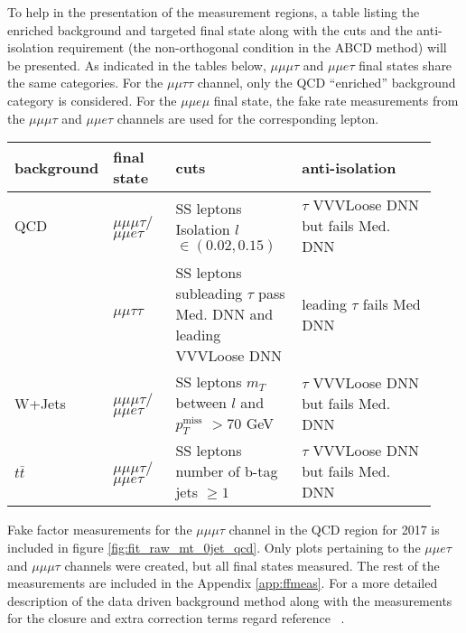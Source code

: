 To help in the presentation of the measurement regions, a table listing the enriched background and targeted final state along with the cuts and the anti-isolation requirement (the non-orthogonal condition in the ABCD method) will be presented. 
As indicated in the tables below, $\mu\mu\mu\tau$ and $\mu\mu e \tau$ final states share the same categories. For the $\mu\mu\tau\tau$ channel, only the QCD ``enriched'' background category is considered. 
For the $\mu\mu e\mu$ final state, the fake rate measurements from the $\mu\mu\mu\tau$ and $\mu\mu e \tau$ channels are used for the corresponding lepton. 


\begin{table}[h!tbp]
\centering
{}
\begin{tabular*}{0.9\textwidth}{|p{0.15\linewidth}|p{0.15\linewidth}|p{0.3\linewidth}|p{0.333\linewidth}|}
\hline
background &  final state      &  cuts & anti-isolation \\\hline 

QCD & $\mu\mu\mu\tau$/$\mu\mu e\tau$  & SS leptons Isolation \hspace{.05\linewidth} $l$ $\in(0.02,0.15)$ & $\tau$ VVVLoose DNN but fails Med. DNN \\
    & $\mu\mu\tau\tau$  & SS leptons subleading $\tau$ pass Med. DNN and leading VVVLoose DNN & leading $\tau$ fails Med DNN \\\hline

W+Jets & $\mu\mu\mu\tau$/$\mu\mu e\tau$  & SS leptons $m_T$ between $l$ and $p_T^{\text{miss}}$ $> 70 $ GeV & $\tau$ VVVLoose DNN but fails Med. DNN \\\hline

$t\bar{t}$ & $\mu\mu\mu\tau$/$\mu\mu e\tau$  & SS leptons number of b-tag jets $\geq 1 $ & $\tau$ VVVLoose DNN but fails Med. DNN \\\hline
\end{tabular*}
\end{table}
Fake factor measurements for the $\mu\mu\mu\tau$ channel in the QCD region for 2017 is included in figure \ref{fig:fit_raw_mt_0jet_qcd}. 
Only plots pertaining to the $\mu\mu e \tau$ and $\mu\mu \mu \tau$ channels were created, but all final states measured. 
The rest of the measurements are included in the Appendix \ref{app:ffmeas}. For a more detailed description of the data driven background method along with the measurements for the closure and extra correction terms regard reference ~\cite{AN16355}.




